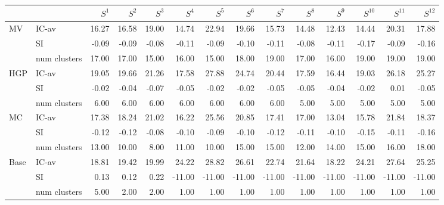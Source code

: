\begin{tabular}{llrrrrrrrrrrrr}
\toprule
 &  & $S^{1}$ & $S^{2}$ & $S^{3}$ & $S^{4}$ & $S^{5}$ & $S^{6}$ & $S^{7}$ & $S^{8}$ & $S^{9}$ & $S^{10}$ & $S^{11}$ & $S^{12}$ \\
\midrule
\multirow[c]{3}{*}{MV} & IC-av & 16.27 & 16.58 & 19.00 & 14.74 & 22.94 & 19.66 & 15.73 & 14.48 & 12.43 & 14.44 & 20.31 & 17.88 \\
 & SI & -0.09 & -0.09 & -0.08 & -0.11 & -0.09 & -0.10 & -0.11 & -0.08 & -0.11 & -0.17 & -0.09 & -0.16 \\
 & num clusters & 17.00 & 17.00 & 15.00 & 16.00 & 15.00 & 18.00 & 19.00 & 17.00 & 16.00 & 19.00 & 19.00 & 19.00 \\
\multirow[c]{3}{*}{HGP} & IC-av & 19.05 & 19.66 & 21.26 & 17.58 & 27.88 & 24.74 & 20.44 & 17.59 & 16.44 & 19.03 & 26.18 & 25.27 \\
 & SI & -0.02 & -0.04 & -0.07 & -0.05 & -0.02 & -0.02 & -0.05 & -0.05 & -0.04 & -0.02 & 0.01 & -0.05 \\
 & num clusters & 6.00 & 6.00 & 6.00 & 6.00 & 6.00 & 6.00 & 6.00 & 5.00 & 5.00 & 5.00 & 5.00 & 5.00 \\
\multirow[c]{3}{*}{MC} & IC-av & 17.38 & 18.24 & 21.02 & 16.22 & 25.56 & 20.85 & 17.41 & 17.00 & 13.04 & 15.78 & 21.84 & 18.37 \\
 & SI & -0.12 & -0.12 & -0.08 & -0.10 & -0.09 & -0.10 & -0.12 & -0.11 & -0.10 & -0.15 & -0.11 & -0.16 \\
 & num clusters & 13.00 & 10.00 & 8.00 & 11.00 & 10.00 & 15.00 & 15.00 & 12.00 & 14.00 & 15.00 & 16.00 & 18.00 \\
\multirow[c]{3}{*}{Base} & IC-av & 18.81 & 19.42 & 19.99 & 24.22 & 28.82 & 26.61 & 22.74 & 21.64 & 18.22 & 24.21 & 27.64 & 25.25 \\
 & SI & 0.13 & 0.12 & 0.22 & -11.00 & -11.00 & -11.00 & -11.00 & -11.00 & -11.00 & -11.00 & -11.00 & -11.00 \\
 & num clusters & 5.00 & 2.00 & 2.00 & 1.00 & 1.00 & 1.00 & 1.00 & 1.00 & 1.00 & 1.00 & 1.00 & 1.00 \\
\bottomrule
\end{tabular}
